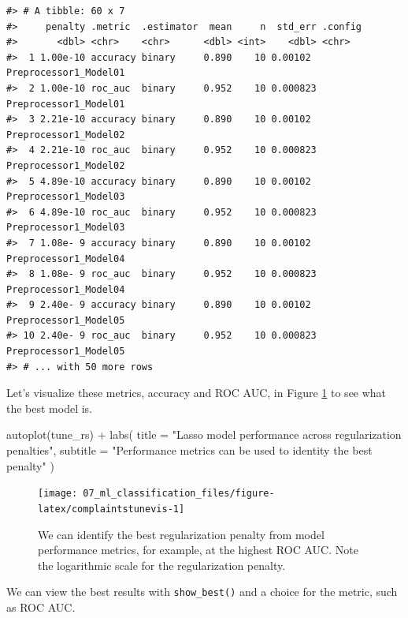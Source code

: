 \documentclass[
]{krantz}
\makeatletter
\newenvironment{Shaded}{\begin{snugshade}}{\end{snugshade}}
\newcommand{\AttributeTok}[1]{\textcolor[rgb]{0.77,0.63,0.00}{#1}}
\newcommand{\FunctionTok}[1]{\textcolor[rgb]{0.00,0.00,0.00}{#1}}
\newcommand{\NormalTok}[1]{#1}
\newcommand{\SpecialCharTok}[1]{\textcolor[rgb]{0.00,0.00,0.00}{#1}}
\newcommand{\StringTok}[1]{\textcolor[rgb]{0.31,0.60,0.02}{#1}}
\newenvironment{kframe}{%
\medskip{}
\setlength{\fboxsep}{.8em}
 \def\at@end@of@kframe{}%
 \ifinner\ifhmode%
  \def\at@end@of@kframe{\end{minipage}}%
  \begin{minipage}{\columnwidth}%
 \fi\fi%
 \def\FrameCommand##1{\hskip\@totalleftmargin \hskip-\fboxsep
 \colorbox{shadecolor}{##1}\hskip-\fboxsep
     \hskip-\linewidth \hskip-\@totalleftmargin \hskip\columnwidth}%
 \MakeFramed {\advance\hsize-\width
   \@totalleftmargin\z@ \linewidth\hsize
   \@setminipage}}%
 {\par\unskip\endMakeFramed%
 \at@end@of@kframe}
\renewenvironment{Shaded}{\begin{kframe}}{\end{kframe}}
\makeatother
\begin{document}
\begin{verbatim}
#> # A tibble: 60 x 7
#>     penalty .metric  .estimator  mean     n  std_err .config              
#>       <dbl> <chr>    <chr>      <dbl> <int>    <dbl> <chr>                
#>  1 1.00e-10 accuracy binary     0.890    10 0.00102  Preprocessor1_Model01
#>  2 1.00e-10 roc_auc  binary     0.952    10 0.000823 Preprocessor1_Model01
#>  3 2.21e-10 accuracy binary     0.890    10 0.00102  Preprocessor1_Model02
#>  4 2.21e-10 roc_auc  binary     0.952    10 0.000823 Preprocessor1_Model02
#>  5 4.89e-10 accuracy binary     0.890    10 0.00102  Preprocessor1_Model03
#>  6 4.89e-10 roc_auc  binary     0.952    10 0.000823 Preprocessor1_Model03
#>  7 1.08e- 9 accuracy binary     0.890    10 0.00102  Preprocessor1_Model04
#>  8 1.08e- 9 roc_auc  binary     0.952    10 0.000823 Preprocessor1_Model04
#>  9 2.40e- 9 accuracy binary     0.890    10 0.00102  Preprocessor1_Model05
#> 10 2.40e- 9 roc_auc  binary     0.952    10 0.000823 Preprocessor1_Model05
#> # ... with 50 more rows
\end{verbatim}

Let's visualize these metrics, accuracy and ROC AUC, in Figure \ref{fig:complaintstunevis} to see what the best model is.

\begin{Shaded}
\begin{Highlighting}[]
\FunctionTok{autoplot}\NormalTok{(tune\_rs) }\SpecialCharTok{+}
  \FunctionTok{labs}\NormalTok{(}
    \AttributeTok{title =} \StringTok{"Lasso model performance across regularization penalties"}\NormalTok{,}
    \AttributeTok{subtitle =} \StringTok{"Performance metrics can be used to identity the best penalty"}
\NormalTok{  )}
\end{Highlighting}
\end{Shaded}

\begin{figure}

{\centering \texttt{[image: 07\_ml\_classification\_files/figure-latex/complaintstunevis-1]} 

}

\caption{We can identify the best regularization penalty from model performance metrics, for example, at the highest ROC AUC. Note the logarithmic scale for the regularization penalty.}\label{fig:complaintstunevis}
\end{figure}

We can view the best results with \texttt{show\_best()} and a choice for the metric, such as ROC AUC.
\end{document}
